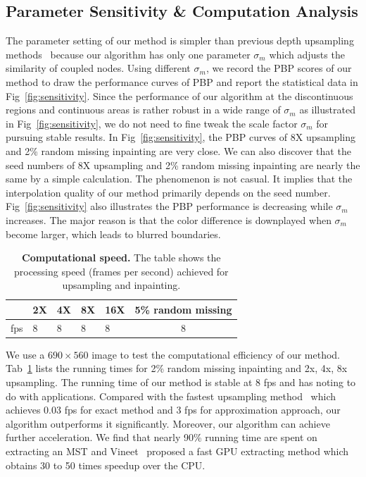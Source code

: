 \documentclass[preprint,10pt,5p,times,twocolumn]{elsarticle}
\begin{document}
\subsection{Parameter Sensitivity \& Computation Analysis}
\label{sec:sensitivity}








The parameter setting of our method is simpler than previous depth upsampling methods~\cite{Liu2013,Park2011,YangJingyu2012,Diebel2005,Dolson2010,Kopf2007,YangQingxiong2007, Choi_TIP_2014, Kang_ET_2014} because our algorithm has only one parameter $\sigma_m$ which adjusts the similarity of coupled nodes. Using different $\sigma_m$, we record the PBP scores of our method to draw the performance curves of PBP and report the statistical data in Fig~\ref{fig:sensitivity}. Since the performance of our algorithm at the discontinuous regions and continuous areas is rather robust in a wide range of $\sigma_m$ as illustrated in Fig~\ref{fig:sensitivity}, we do not need to fine tweak the scale factor $\sigma_m$ for pursuing stable results. In Fig~\ref{fig:sensitivity}, the PBP curves of 8X upsampling and 2\% random missing inpainting are very close. We can also discover that the seed numbers of 8X upsampling and 2\% random missing inpainting are nearly the same by a simple calculation. The phenomenon is not casual. It implies that the interpolation quality of our method primarily depends on the seed number. Fig~\ref{fig:sensitivity} also illustrates the PBP performance is decreasing while $\sigma_m$ increases. The major reason is that the color difference is downplayed when $\sigma_m$ become larger, which leads to blurred boundaries.

%
\begin{table}[b]
\centering
\begin{tabular}{|p{0.6cm}<{\centering}|p{0.6cm}<{\centering}|p{0.6cm}<{\centering}|p{0.6cm}<{\centering}|p{0.6cm}<{\centering}|c|}
\hline
& 2X & 4X & 8X & 16X & 5\% random missing \\
\hline
fps & 8 & 8 & 8 & 8 & 8 \\
\hline
\end{tabular}
\caption{\textbf{Computational  speed.} The table shows the processing speed (frames per second) achieved for upsampling and inpainting.}
\label{tab:speed}
\end{table}
%


We use a $690 \times 560$ image to test the computational efficiency of our method. Tab~\ref{tab:speed} lists the running times for 2\% random missing inpainting and 2x, 4x, 8x upsampling. The running time of our method is stable at 8 fps and has noting to do with applications. Compared with the fastest upsampling method~\cite{Liu2013} which achieves 0.03 fps for exact method and 3 fps for approximation approach, our algorithm outperforms it significantly. Moreover, our algorithm can achieve further acceleration. We find that nearly 90\% running time are spent on extracting an MST and Vineet~\cite{Vineet2009} proposed a fast GPU extracting method which obtains 30 to 50 times speedup over the CPU.
\end{document}
